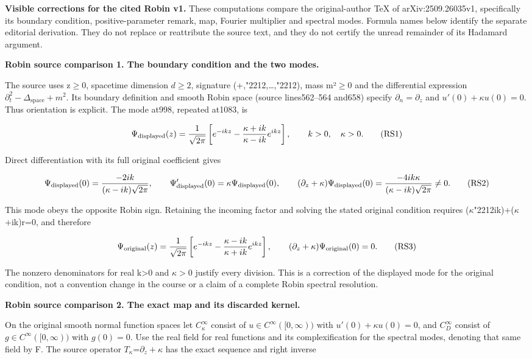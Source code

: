 \documentclass[
  11pt,
]{article}
\begin{document}
\textbf{Visible corrections for the cited Robin v1.} These computations
compare the original-author TeX of arXiv:2509.26035v1, specifically its
boundary condition, positive-parameter remark, map, Fourier multiplier
and spectral modes. Formula names below identify the separate editorial
derivation. They do not replace or reattribute the source text, and they
do not certify the unread remainder of its Hadamard argument.

\textbf{Robin source comparison 1. The boundary condition and the two
modes.}

The source uses z\ensuremath{\geq}0, spacetime dimension \(d\geq 2\), signature
(+,{\ReaderSymbols\char"2212},\ldots,{\ReaderSymbols\char"2212}), mass m²\ensuremath{\geq}0 and the differential expression
\ensuremath{\partial_t^2-\Delta_{\mathrm{space}}+m^2}. Its boundary definition and smooth Robin space
(source lines562--564 and658) specify \ensuremath{\partial_n=\partial_z} and
\(u'(0)+\kappa u(0)=0\). Thus orientation is explicit. The mode at998,
repeated at1083, is

\[
 \Psi_{\rm displayed}(z)=\frac1{\sqrt{2\pi}}
 \left[e^{-ikz}-\frac{\kappa+ik}{\kappa-ik}e^{ikz}\right],
 \qquad k>0,\quad\kappa>0.
 \tag{RS1}
\]

Direct differentiation with its full original coefficient gives

{\small
\[
 \Psi_{\rm displayed}(0)=\frac{-2ik}{(\kappa-ik)\sqrt{2\pi}},\qquad
 \Psi_{\rm displayed}'(0)=\kappa\Psi_{\rm displayed}(0),\qquad
 (\partial_z+\kappa)\Psi_{\rm displayed}(0)
                 =\frac{-4ik\kappa}{(\kappa-ik)\sqrt{2\pi}}\ne0.
 \tag{RS2}
\]
}

This mode obeys the opposite Robin sign. Retaining the incoming factor
and solving the stated original condition requires (\ensuremath{\kappa}{\ReaderSymbols\char"2212}ik)+(\ensuremath{\kappa}+ik)r=0, and
therefore

\[
 \Psi_{\rm original}(z)=\frac1{\sqrt{2\pi}}
 \left[e^{-ikz}-\frac{\kappa-ik}{\kappa+ik}e^{ikz}\right],\qquad
 (\partial_z+\kappa)\Psi_{\rm original}(0)=0.
 \tag{RS3}
\]

The nonzero denominators for real k\textgreater0 and \(\kappa >0\)
justify every division. This is a correction of the displayed mode for
the original condition, not a convention change in the course or a claim
of a complete Robin spectral resolution.

\textbf{Robin source comparison 2. The exact map and its discarded
kernel.}

On the original smooth normal function spaces let \(C_\kappa ^\infty \)
consist of \(u\in C^\infty ([0,\infty ))\) with \(u'(0)+\kappa u(0)=0\),
and \(C_D^\infty \) consist of \(g\in C^\infty ([0,\infty ))\) with
\(g(0)=0\). Use the real field for real functions and its
complexification for the spectral modes, denoting that same field by F.
The source operator \(T_\kappa \)=\ensuremath{\partial_z+\kappa} has the exact sequence and right
inverse
\end{document}
